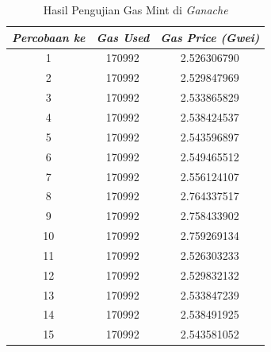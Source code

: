 \begin{enumerate}
        \begin{longtable}{|c|c|c|}
          \caption{Hasil Pengujian Gas Mint di \emph{Ganache}}
          \label{tb:UjiGasMintGanache}                                                               \\
          \hline
          \rowcolor[HTML]{C0C0C0}
          \textbf{\emph{Percobaan ke}} & \textbf{\emph{Gas Used}} & \textbf{\emph{Gas Price (Gwei)}} \\
          \hline
          1                            & 170992                   & 2.526306790                      \\
          2                            & 170992                   & 2.529847969                      \\
          3                            & 170992                   & 2.533865829                      \\
          4                            & 170992                   & 2.538424537                      \\
          5                            & 170992                   & 2.543596897                      \\
          6                            & 170992                   & 2.549465512                      \\
          7                            & 170992                   & 2.556124107                      \\
          8                            & 170992                   & 2.764337517                      \\
          9                            & 170992                   & 2.758433902                      \\
          10                           & 170992                   & 2.759269134                      \\
          11                           & 170992                   & 2.526303233                      \\
          12                           & 170992                   & 2.529832132                      \\
          13                           & 170992                   & 2.533847239                      \\
          14                           & 170992                   & 2.538491925                      \\
          15                           & 170992                   & 2.543581052                      \\
          \hline
        \end{longtable}


\end{enumerate}
